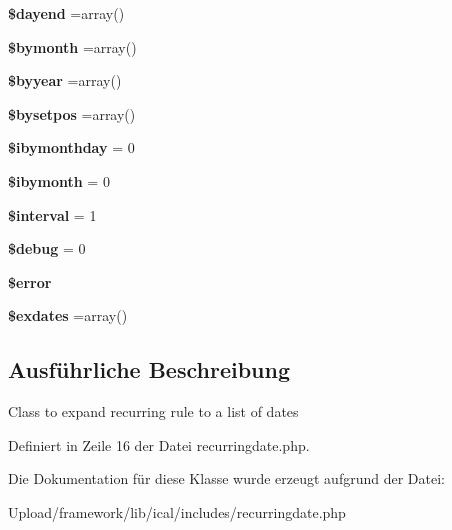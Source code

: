 \begin{DoxyCompactItemize}
{\bfseries \$dayend} =array()
\item 
\mbox{\label{class_z_c_recurring_date_af0d9f8a16fff68e1ec27c6847ee83496}} 
{\bfseries \$bymonth} =array()
\item 
\mbox{\label{class_z_c_recurring_date_a0ed5c52b4c1104693e3b09c0fc1eb219}} 
{\bfseries \$byyear} =array()
\item 
\mbox{\label{class_z_c_recurring_date_ac8389107be8058c4061a338e2fce95fe}} 
{\bfseries \$bysetpos} =array()
\item 
\mbox{\label{class_z_c_recurring_date_aa4d93163e8b16c0f9cd3182c152cfb82}} 
{\bfseries \$ibymonthday} = 0
\item 
\mbox{\label{class_z_c_recurring_date_ab11e01b6d98994ec2b9c889d6cda714c}} 
{\bfseries \$ibymonth} = 0
\item 
\mbox{\label{class_z_c_recurring_date_a98186808ef39b8adeff65a71857bdfa5}} 
{\bfseries \$interval} = 1
\item 
\mbox{\label{class_z_c_recurring_date_a9cfbf085597b76e9881ba7297c4f9b53}} 
{\bfseries \$debug} = 0
\item 
\mbox{\label{class_z_c_recurring_date_a7936a116dba45fc0c8f9d3090ac6caac}} 
{\bfseries \$error}
\item 
\mbox{\label{class_z_c_recurring_date_a39fd42315c9bc28a5b1ad521a66f1686}} 
{\bfseries \$exdates} =array()
\end{DoxyCompactItemize}


\subsection{Ausführliche Beschreibung}
Class to expand recurring rule to a list of dates 

Definiert in Zeile 16 der Datei recurringdate.\+php.



Die Dokumentation für diese Klasse wurde erzeugt aufgrund der Datei\+:\begin{DoxyCompactItemize}
\item 
Upload/framework/lib/ical/includes/recurringdate.\+php\end{DoxyCompactItemize}
